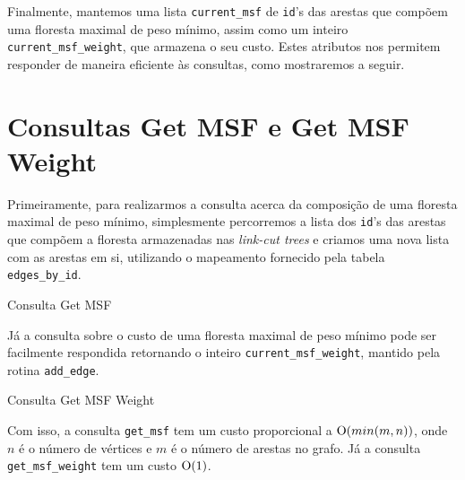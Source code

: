 Finalmente, mantemos uma lista \texttt{current\_msf} de \texttt{id}'s das arestas que compõem uma floresta maximal de peso mínimo, assim como um inteiro \texttt{current\_msf\_weight}, que armazena o seu custo. Estes atributos nos permitem responder de maneira eficiente às consultas, como mostraremos a seguir.

\section{Consultas Get MSF e Get MSF Weight}
\label{sec:imsf-get-msf}

Primeiramente, para realizarmos a consulta acerca da composição de uma floresta maximal de peso mínimo, simplesmente percorremos a lista dos \texttt{id}'s das arestas que compõem a floresta armazenadas nas \emph{link-cut trees} e criamos uma nova lista com as arestas em si, utilizando o mapeamento fornecido pela tabela \texttt{edges\_by\_id}.

\begin{algorithm}[h!]
    \caption{Consulta Get MSF}\label{imsf-get-msf}
    \begin{algorithmic}[1]
        \EndFor
        \State {}
        \EndFunction
    \end{algorithmic}
\end{algorithm}

Já a consulta sobre o custo de uma floresta maximal de peso mínimo pode ser facilmente respondida retornando o inteiro \texttt{current\_msf\_weight}, mantido pela rotina \texttt{add\_edge}.

\begin{algorithm}[h!]
    \caption{Consulta Get MSF Weight}\label{imsf-get-msf-weight}
    \begin{algorithmic}[1]
        \State {}
        \EndFunction
    \end{algorithmic}
\end{algorithm}

Com isso, a consulta \texttt{get\_msf} tem um custo proporcional a $\mathrm{O}(min(m, n))$, onde $n$ é o número de vértices e $m$ é o número de arestas no grafo. Já a consulta \texttt{get\_msf\_weight} tem um custo $\mathrm{O}(1)$.

